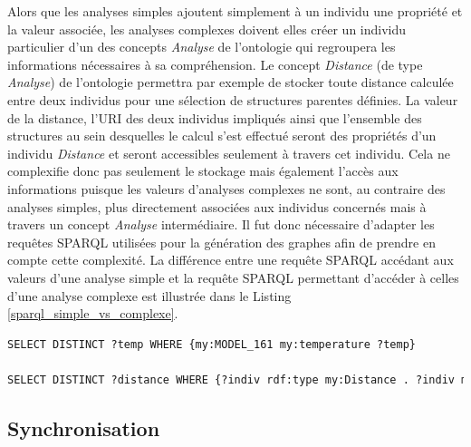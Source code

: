 Alors que les analyses simples ajoutent simplement à un individu une propriété et la valeur associée, les analyses complexes doivent elles créer un individu particulier d'un des concepts \textit{Analyse} de l'ontologie qui regroupera les informations nécessaires à sa compréhension. Le concept \textit{Distance} (de type \textit{Analyse}) de l'ontologie permettra par exemple de stocker toute distance calculée entre deux individus pour une sélection de structures parentes définies. La valeur de la distance, l'URI des deux individus impliqués ainsi que l'ensemble des structures au sein desquelles le calcul s'est effectué seront des propriétés d'un individu \textit{Distance} et seront accessibles seulement à travers cet individu. Cela ne complexifie donc pas seulement le stockage mais également l'accès aux informations puisque les valeurs d'analyses complexes ne sont, au contraire des analyses simples, plus directement associées aux individus concernés mais à travers un concept \textit{Analyse} intermédiaire. Il fut donc nécessaire d'adapter les requêtes SPARQL utilisées pour la génération des graphes afin de prendre en compte cette complexité. La différence entre une requête SPARQL accédant aux valeurs d'une analyse simple et la requête SPARQL permettant d'accéder à celles d'une analyse complexe est illustrée dans le Listing \ref{sparql_simple_vs_complexe}.

\begin{lstlisting}[language=XML, caption=Deux requêtes SPARQL: 1. Accès à la température d'un modèle 2. Accès à la distance entre deux résidus, label=sparql_simple_vs_complexe]
SELECT DISTINCT ?temp WHERE {my:MODEL_161 my:temperature ?temp}

SELECT DISTINCT ?distance WHERE {?indiv rdf:type my:Distance . ?indiv my:objectA my:RES_3622 . ?indiv my:objectB my:RES_3626 . ?indiv my:distance ?distance}
\end{lstlisting}

\subsection{Synchronisation}

